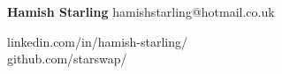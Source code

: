 \documentclass{Resume}
\begin{document}
\titlespacing*{\section}{0pt}{2.8em}{1em}



\begin{minipage}[t]{0.5\textwidth}
\begin{flushleft}
    {\LARGE\textbf{Hamish Starling}}
    hamishstarling@hotmail.co.uk \\
\end{flushleft}    
\end{minipage}
\begin{minipage}[t]{0.5\textwidth}
    \begin{flushright}
            linkedin.com/in/hamish-starling/ \\
            github.com/starswap/            
    \end{flushright}    
\end{minipage}






\end{document}
